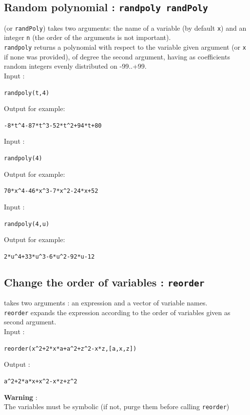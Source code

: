 \documentclass[a4paper,11pt]{book}
\begin{document}
\subsection{Random polynomial : {\tt randpoly randPoly}}
 (or {\tt randPoly}) takes two arguments: the name of a 
variable (by default {\tt x}) and  an integer {\tt n} (the order of the
arguments is not important).\\
{\tt randpoly} returns a polynomial with respect to the variable 
given argument (or {\tt x} if none was provided), 
of degree the second argument, having as coefficients
random integers evenly distributed on -99..+99.\\ 
Input :
\begin{center}{\tt randpoly(t,4)}\end{center}
Output for example:
\begin{center}{\tt -8*t\verb|^|4-87*t\verb|^|3-52*t\verb|^|2+94*t+80}\end{center}
Input :
\begin{center}{\tt randpoly(4)}\end{center}
Output for example:
\begin{center}{\tt 70*x\verb|^|4-46*x\verb|^|3-7*x\verb|^|2-24*x+52}\end{center}
Input :
\begin{center}{\tt randpoly(4,u)}\end{center}
Output for example:
\begin{center}{\tt 2*u\verb|^|4+33*u\verb|^|3-6*u\verb|^|2-92*u-12}\end{center}

\subsection{Change the order of variables : {\tt reorder}}
  takes  two arguments : an expression and a vector 
of variable names.\\
{\tt reorder} expands the expression according to the order of variables
given as second argument.\\
Input :
\begin{center}{\tt reorder(x\verb|^|2+2*x*a+a\verb|^|2+z\verb|^|2-x*z,[a,x,z])}\end{center}
Output :
\begin{center}{\tt a\verb|^|2+2*a*x+x\verb|^|2-x*z+z\verb|^|2}\end{center}
{\bf Warning} :\\
The variables must be symbolic (if not, purge them before calling
{\tt reorder})
\end{document}
